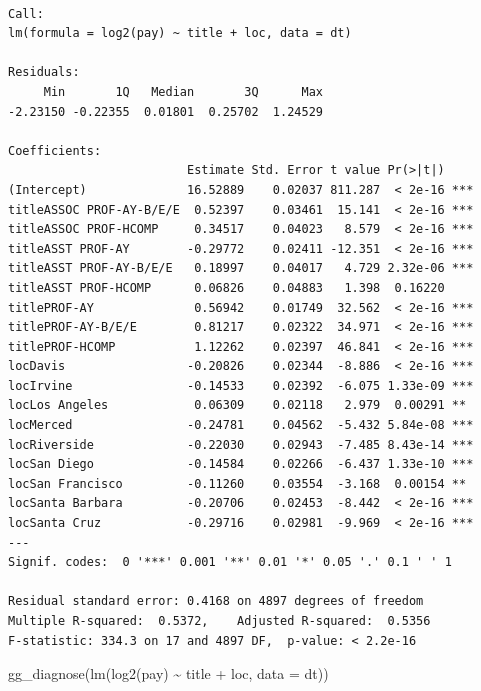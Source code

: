 \documentclass[
  letterpaper,
  DIV=11,
  numbers=noendperiod]{scrreprt}
\newenvironment{Shaded}{\begin{snugshade}}{\end{snugshade}}
\newcommand{\AttributeTok}[1]{\textcolor[rgb]{0.40,0.45,0.13}{#1}}
\newcommand{\FunctionTok}[1]{\textcolor[rgb]{0.28,0.35,0.67}{#1}}
\newcommand{\NormalTok}[1]{\textcolor[rgb]{0.00,0.23,0.31}{#1}}
\newcommand{\SpecialCharTok}[1]{\textcolor[rgb]{0.37,0.37,0.37}{#1}}
\begin{document}
\begin{verbatim}

Call:
lm(formula = log2(pay) ~ title + loc, data = dt)

Residuals:
     Min       1Q   Median       3Q      Max 
-2.23150 -0.22355  0.01801  0.25702  1.24529 

Coefficients:
                         Estimate Std. Error t value Pr(>|t|)    
(Intercept)              16.52889    0.02037 811.287  < 2e-16 ***
titleASSOC PROF-AY-B/E/E  0.52397    0.03461  15.141  < 2e-16 ***
titleASSOC PROF-HCOMP     0.34517    0.04023   8.579  < 2e-16 ***
titleASST PROF-AY        -0.29772    0.02411 -12.351  < 2e-16 ***
titleASST PROF-AY-B/E/E   0.18997    0.04017   4.729 2.32e-06 ***
titleASST PROF-HCOMP      0.06826    0.04883   1.398  0.16220    
titlePROF-AY              0.56942    0.01749  32.562  < 2e-16 ***
titlePROF-AY-B/E/E        0.81217    0.02322  34.971  < 2e-16 ***
titlePROF-HCOMP           1.12262    0.02397  46.841  < 2e-16 ***
locDavis                 -0.20826    0.02344  -8.886  < 2e-16 ***
locIrvine                -0.14533    0.02392  -6.075 1.33e-09 ***
locLos Angeles            0.06309    0.02118   2.979  0.00291 ** 
locMerced                -0.24781    0.04562  -5.432 5.84e-08 ***
locRiverside             -0.22030    0.02943  -7.485 8.43e-14 ***
locSan Diego             -0.14584    0.02266  -6.437 1.33e-10 ***
locSan Francisco         -0.11260    0.03554  -3.168  0.00154 ** 
locSanta Barbara         -0.20706    0.02453  -8.442  < 2e-16 ***
locSanta Cruz            -0.29716    0.02981  -9.969  < 2e-16 ***
---
Signif. codes:  0 '***' 0.001 '**' 0.01 '*' 0.05 '.' 0.1 ' ' 1

Residual standard error: 0.4168 on 4897 degrees of freedom
Multiple R-squared:  0.5372,    Adjusted R-squared:  0.5356 
F-statistic: 334.3 on 17 and 4897 DF,  p-value: < 2.2e-16
\end{verbatim}

\begin{Shaded}
\begin{Highlighting}[]
\FunctionTok{gg\_diagnose}\NormalTok{(}\FunctionTok{lm}\NormalTok{(}\FunctionTok{log2}\NormalTok{(pay) }\SpecialCharTok{\textasciitilde{}}\NormalTok{ title }\SpecialCharTok{+}\NormalTok{ loc, }\AttributeTok{data =}\NormalTok{ dt))}
\end{Highlighting}
\end{Shaded}
\end{document}
